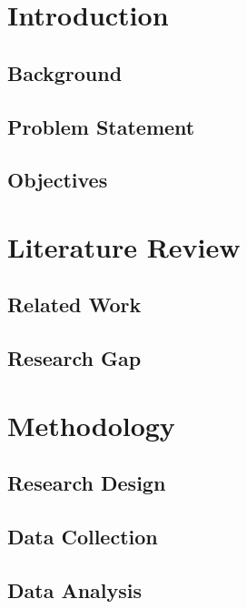 \documentclass[a4paper,12pt]{report}
\begin{document}
\small


\tableofcontents
\clearpage


\chapter{Introduction}
\section{Background}
\section{Problem Statement}
\section{Objectives}

\chapter{Literature Review}
\section{Related Work}
\section{Research Gap}

\chapter{Methodology}
\section{Research Design}
\section{Data Collection}
\section{Data Analysis}
\end{document}
